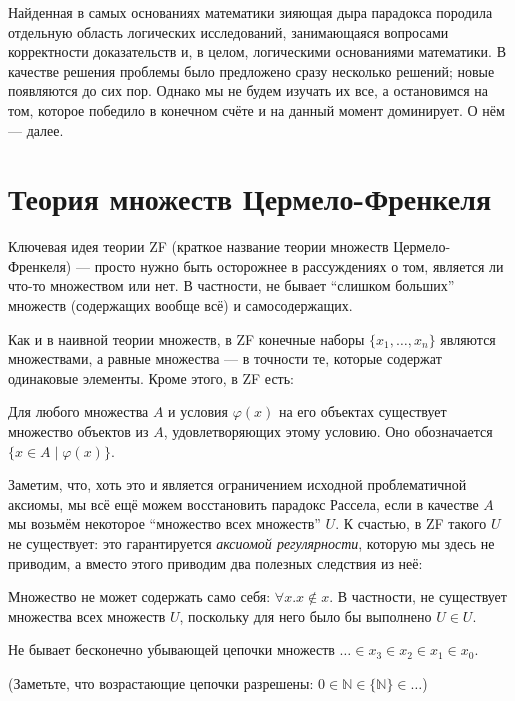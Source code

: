 Найденная в самых основаниях математики зияющая дыра парадокса породила
отдельную область логических исследований, занимающаяся вопросами
корректности доказательств и, в целом, логическими основаниями математики.
В качестве решения проблемы было предложено сразу несколько решений; новые
появляются до сих пор. Однако мы не будем изучать их все, а остановимся на том,
которое победило в конечном счёте и на данный момент доминирует.
О нём --- далее.

\section{Теория множеств Цермело-Френкеля}

Ключевая идея теории ZF (краткое название теории множеств Цермело-Френкеля) ---
просто нужно быть осторожнее в рассуждениях о том, является ли что-то множеством
или нет. В частности, не бывает ``слишком больших'' множеств (содержащих вообще
всё) и самосодержащих.

Как и в наивной теории множеств, в ZF конечные наборы $\{x_1,\ldots,x_n\}$
являются множествами, а равные множества --- в точности те, которые содержат
одинаковые элементы. Кроме этого, в ZF есть:

\begin{ax}
  Для любого множества $A$ и условия $\varphi(x)$ на его объектах существует
  множество объектов из $A$, удовлетворяющих этому условию. Оно обозначается
  $\{x\in A\;|\;\varphi(x)\}$.
\end{ax}

Заметим, что, хоть это и является ограничением исходной проблематичной аксиомы,
мы всё ещё можем восстановить парадокс Рассела, если в качестве $A$ мы возьмём
некоторое ``множество всех множеств'' $U$. К счастью, в ZF такого $U$ не
существует: это гарантируется \textit{аксиомой регулярности}, которую мы здесь
не приводим, а вместо этого приводим два полезных следствия из неё:

\begin{impl}
  Множество не может содержать само себя: $\forall x.x\not\in x$. В частности,
  не существует множества всех множеств $U$, поскольку для него было бы
  выполнено $U\in U$.
\end{impl}
\begin{impl}
  Не бывает бесконечно убывающей цепочки множеств
  $\ldots\in x_3\in x_2\in x_1\in x_0$.
\end{impl}
(Заметьте, что возрастающие цепочки разрешены:
$0\in\mathbb{N}\in\{\mathbb{N}\}\in\ldots$)

